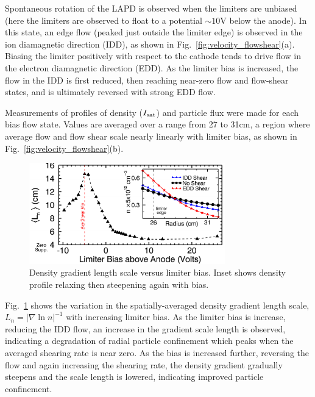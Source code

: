 \documentclass[aps,prl,amsmath,amssymb,preprint,superscriptaddress]{revtex4}
\begin{document}
Spontaneous rotation of the LAPD is observed when the limiters are
unbiased (here the limiters are observed to float to a
potential $\sim 10$V below the anode).  In this state, an edge flow
(peaked just outside the limiter edge) is
observed in the ion diamagnetic direction (IDD), as shown in
Fig.~\ref{fig:velocity_flowshear}(a).  Biasing the limiter positively
with respect to the cathode tends to drive flow in the electron
diamagnetic direction (EDD).  As the limiter bias is increased, the
flow in the IDD is first reduced, then reaching near-zero flow
and flow-shear states, and is ultimately reversed with strong EDD flow.

Measurements of profiles of density ($I_{\rm sat}$) and particle flux
were made for each bias flow state. Values are averaged over a range
from 27 to 31cm, a region where average flow and flow shear scale
nearly linearly with limiter bias, as shown in
Fig.~\ref{fig:velocity_flowshear}(b).  

\begin{figure}[!htbp]
\centerline{
\includegraphics[width=8.5cm]{densgrad.pdf}}
\caption{\label{fig:densgrad} Density gradient length scale versus limiter bias. Inset shows density profile relaxing then steepening again with bias.}
\end{figure}

Fig.~\ref{fig:densgrad} shows the variation in the spatially-averaged density gradient length scale, $L_{n} = \lvert \nabla \ln n \rvert ^{-1}$ with
increasing limiter bias.  As the limiter bias is increase, reducing
the IDD flow, an increase in the gradient scale length is observed,
indicating a degradation of radial particle confinement which peaks
when the averaged shearing rate is near zero.  
As the bias is
increased further, reversing the flow and again increasing the
shearing rate, the density gradient gradually steepens and the
scale length is lowered, indicating improved particle confinement.  
\end{document}
